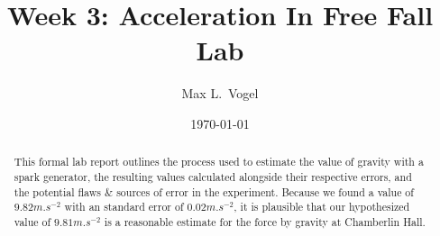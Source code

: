 \documentclass[11pt]{article}
\title{Week 3: Acceleration In Free Fall Lab}
\author{Max L.~Vogel}
\date{\today}
\begin{document}
\maketitle

\begin{abstract}
    This formal lab report outlines the process used to estimate the value of gravity with a spark generator, the resulting values calculated alongside their respective errors, and the potential flaws \& sources of error in the experiment. Because we found a value of $9.82\si{m.s^{-2}}$ with an standard error of $0.02 \si{m.s^{-2}}$, it is plausible that our  hypothesized value of $9.81 \si{m.s^{-2}}$ is a reasonable estimate for the force by gravity at Chamberlin Hall.
\end{abstract}

\bigskip    %
\end{document}
